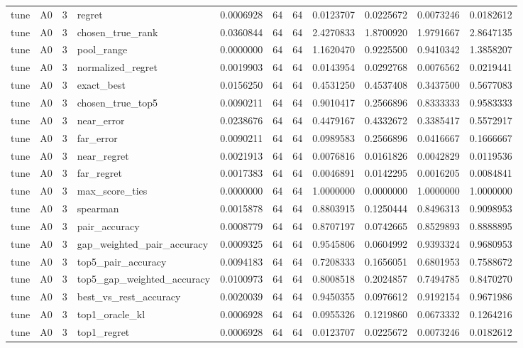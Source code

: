 \begin{tabular}{llrlrrrrrrr}
tune & A0 & 3 & regret & 0.0006928 & 64 & 64 & 0.0123707 & 0.0225672 & 0.0073246 & 0.0182612 \\
tune & A0 & 3 & chosen_true_rank & 0.0360844 & 64 & 64 & 2.4270833 & 1.8700920 & 1.9791667 & 2.8647135 \\
tune & A0 & 3 & pool_range & 0.0000000 & 64 & 64 & 1.1620470 & 0.9225500 & 0.9410342 & 1.3858207 \\
tune & A0 & 3 & normalized_regret & 0.0019903 & 64 & 64 & 0.0143954 & 0.0292768 & 0.0076562 & 0.0219441 \\
tune & A0 & 3 & exact_best & 0.0156250 & 64 & 64 & 0.4531250 & 0.4537408 & 0.3437500 & 0.5677083 \\
tune & A0 & 3 & chosen_true_top5 & 0.0090211 & 64 & 64 & 0.9010417 & 0.2566896 & 0.8333333 & 0.9583333 \\
tune & A0 & 3 & near_error & 0.0238676 & 64 & 64 & 0.4479167 & 0.4332672 & 0.3385417 & 0.5572917 \\
tune & A0 & 3 & far_error & 0.0090211 & 64 & 64 & 0.0989583 & 0.2566896 & 0.0416667 & 0.1666667 \\
tune & A0 & 3 & near_regret & 0.0021913 & 64 & 64 & 0.0076816 & 0.0161826 & 0.0042829 & 0.0119536 \\
tune & A0 & 3 & far_regret & 0.0017383 & 64 & 64 & 0.0046891 & 0.0142295 & 0.0016205 & 0.0084841 \\
tune & A0 & 3 & max_score_ties & 0.0000000 & 64 & 64 & 1.0000000 & 0.0000000 & 1.0000000 & 1.0000000 \\
tune & A0 & 3 & spearman & 0.0015878 & 64 & 64 & 0.8803915 & 0.1250444 & 0.8496313 & 0.9098953 \\
tune & A0 & 3 & pair_accuracy & 0.0008779 & 64 & 64 & 0.8707197 & 0.0742665 & 0.8529893 & 0.8888895 \\
tune & A0 & 3 & gap_weighted_pair_accuracy & 0.0009325 & 64 & 64 & 0.9545806 & 0.0604992 & 0.9393324 & 0.9680953 \\
tune & A0 & 3 & top5_pair_accuracy & 0.0094183 & 64 & 64 & 0.7208333 & 0.1656051 & 0.6801953 & 0.7588672 \\
tune & A0 & 3 & top5_gap_weighted_accuracy & 0.0100973 & 64 & 64 & 0.8008518 & 0.2024857 & 0.7494785 & 0.8470270 \\
tune & A0 & 3 & best_vs_rest_accuracy & 0.0020039 & 64 & 64 & 0.9450355 & 0.0976612 & 0.9192154 & 0.9671986 \\
tune & A0 & 3 & top1_oracle_kl & 0.0006928 & 64 & 64 & 0.0955326 & 0.1219860 & 0.0673332 & 0.1264216 \\
tune & A0 & 3 & top1_regret & 0.0006928 & 64 & 64 & 0.0123707 & 0.0225672 & 0.0073246 & 0.0182612 \\

\end{tabular}
